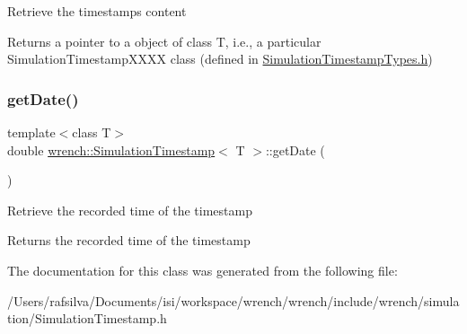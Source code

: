 Retrieve the timestamp\textquotesingle{}s content

\begin{DoxyReturn}{Returns}
a pointer to a object of class T, i.\+e., a particular Simulation\+Timestamp\+X\+X\+XX class (defined in \hyperlink{_simulation_timestamp_types_8h_source}{Simulation\+Timestamp\+Types.\+h}) 
\end{DoxyReturn}
\mbox{\label{classwrench_1_1_simulation_timestamp_a706030fdac38ad1e853e588f7260c499}} 
\subsubsection{\texorpdfstring{get\+Date()}{getDate()}}
{\footnotesize\ttfamily template$<$class T$>$ \\
double \hyperlink{classwrench_1_1_simulation_timestamp}{wrench\+::\+Simulation\+Timestamp}$<$ T $>$\+::get\+Date (\begin{DoxyParamCaption}{ }\end{DoxyParamCaption})\hspace{0.3cm}{\ttfamily [inline]}}

Retrieve the recorded time of the timestamp

\begin{DoxyReturn}{Returns}
the recorded time of the timestamp 
\end{DoxyReturn}


The documentation for this class was generated from the following file\+:\begin{DoxyCompactItemize}
\item 
/\+Users/rafsilva/\+Documents/isi/workspace/wrench/wrench/include/wrench/simulation/Simulation\+Timestamp.\+h\end{DoxyCompactItemize}

